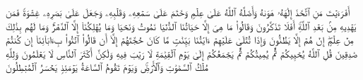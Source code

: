 \stopbuffer%
\startbuffer[\q:45:23]
أَفَرَءَیۡتَ مَنِ ٱتَّخَذَ إِلَٰهَهُۥ هَوَىٰهُ وَأَضَلَّهُ ٱللَّهُ عَلَىٰ عِلۡمࣲ وَخَتَمَ عَلَىٰ سَمۡعِهِۦ وَقَلۡبِهِۦ وَجَعَلَ عَلَىٰ بَصَرِهِۦ غِشَٰوَةࣰ فَمَن یَهۡدِیهِ مِنۢ بَعۡدِ ٱللَّهِۚ أَفَلَا تَذَكَّرُونَ%
\stopbuffer%
\startbuffer[\q:45:24]
وَقَالُوا۟ مَا هِیَ إِلَّا حَیَاتُنَا ٱلدُّنۡیَا نَمُوتُ وَنَحۡیَا وَمَا یُهۡلِكُنَاۤ إِلَّا ٱلدَّهۡرُۚ وَمَا لَهُم بِذَٰلِكَ مِنۡ عِلۡمٍۖ إِنۡ هُمۡ إِلَّا یَظُنُّونَ%
\stopbuffer%
\startbuffer[\q:45:25]
وَإِذَا تُتۡلَىٰ عَلَیۡهِمۡ ءَایَٰتُنَا بَیِّنَٰتࣲ مَّا كَانَ حُجَّتَهُمۡ إِلَّاۤ أَن قَالُوا۟ ٱئۡتُوا۟ بِءَابَاۤئِنَاۤ إِن كُنتُمۡ صَٰدِقِینَ%
\stopbuffer%
\startbuffer[\q:45:26]
قُلِ ٱللَّهُ یُحۡیِیكُمۡ ثُمَّ یُمِیتُكُمۡ ثُمَّ یَجۡمَعُكُمۡ إِلَىٰ یَوۡمِ ٱلۡقِیَٰمَةِ لَا رَیۡبَ فِیهِ وَلَٰكِنَّ أَكۡثَرَ ٱلنَّاسِ لَا یَعۡلَمُونَ%
\stopbuffer%
\startbuffer[\q:45:27]
وَلِلَّهِ مُلۡكُ ٱلسَّمَٰوَٰتِ وَٱلۡأَرۡضِۚ وَیَوۡمَ تَقُومُ ٱلسَّاعَةُ یَوۡمَئِذࣲ یَخۡسَرُ ٱلۡمُبۡطِلُونَ%
\stopbuffer%
